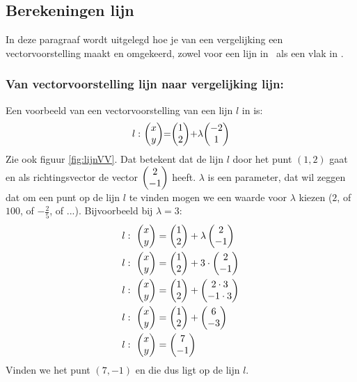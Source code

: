 \subsection{Berekeningen lijn}
In deze paragraaf wordt uitgelegd hoe je van een vergelijking een vectorvoorstelling maakt en omgekeerd, zowel voor een lijn in \RT \ als een vlak in \RD. 

\subsubsection{Van vectorvoorstelling lijn naar vergelijking lijn:} 
Een voorbeeld van een  vectorvoorstelling van een lijn $l$ in \RT is: \[l:\ \vectwee{x}{y} = \vectwee{1}{2} + \lambda \vectwee{-2}{1} \] 
Zie ook figuur \ref{fig:lijnVV}. Dat betekent dat de lijn $l$ door het punt $(1,2)$ gaat en als richtingsvector de vector $ \vectwee {2}{-1} $ heeft. $\lambda$ is een parameter, dat wil zeggen dat om een punt op de lijn $l$ te vinden mogen we een waarde voor $\lambda $ kiezen ($2$, of $100$, of $-\frac{2}{5}$, of ...). Bijvoorbeeld bij  $\lambda=3$: 
\begin{align*}
  l: \ \begin{pmatrix} x \\ y \end{pmatrix} &= \begin{pmatrix} 1 \\ 2 \end{pmatrix}  + \lambda  \begin{pmatrix} 2 \\ -1 \end{pmatrix}  \\
  l: \ \begin{pmatrix} x \\ y \end{pmatrix} &= \begin{pmatrix} 1 \\ 2 \end{pmatrix}  + 3 \cdot \begin{pmatrix} 2 \\ -1 \end{pmatrix}  \\
  l: \ \begin{pmatrix} x \\ y \end{pmatrix} &= \begin{pmatrix} 1 \\ 2 \end{pmatrix}  + \begin{pmatrix} 2\cdot 3 \\ -1\cdot 3 \end{pmatrix}  \\
  l: \ \begin{pmatrix} x \\ y \end{pmatrix} &= \begin{pmatrix} 1 \\ 2 \end{pmatrix}  + \begin{pmatrix} 6 \\ -3 \end{pmatrix}  \\
  l: \ \begin{pmatrix} x \\ y \end{pmatrix} &= \begin{pmatrix} 7 \\ -1 \end{pmatrix}
\end{align*}
Vinden we het punt $(7,-1)$ en die dus ligt op de lijn $l$.

